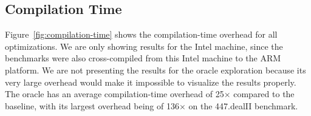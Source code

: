 


\vspace{-2ex}
\subsection{Compilation Time}


Figure~\ref{fig:compilation-time} shows the compilation-time overhead for all
optimizations.
We are only showing results for the Intel machine, since the benchmarks were
also cross-compiled from this Intel machine to the ARM platform.
We are not presenting the results for the oracle exploration because its very
large overhead would make it impossible to visualize the results properly.
The oracle has an average compilation-time overhead of 25$\times$ compared to
the baseline, with its largest overhead being of 136$\times$ on the 447.dealII
benchmark.

